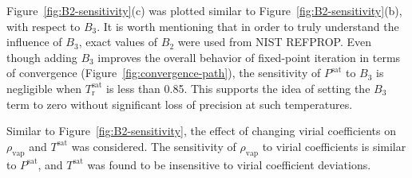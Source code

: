 \documentclass[5p,times]{elsarticle}
\begin{document}
Figure~\ref{fig:B2-sensitivity}(c) was plotted similar to Figure~\ref{fig:B2-sensitivity}(b), with respect to $B_3$. It is worth mentioning that in order to truly understand the influence of $B_3$, exact values of $B_2$ were used from NIST REFPROP. Even though adding $B_3$ improves the overall behavior of fixed-point iteration in terms of convergence (Figure~\ref{fig:convergence-path}), the sensitivity of $P^{\mathrm{sat}}$ to $B_3$ is negligible when $T_\mathrm{r}^\mathrm{sat}$ is less than 0.85. This supports the idea of setting the $B_3$ term to zero without significant loss of precision at such temperatures. 

Similar to Figure~\ref{fig:B2-sensitivity}, the effect of changing virial coefficients on $\rho_\mathrm{vap}$ and $T^\mathrm{sat}$ was considered. The sensitivity of $\rho_\mathrm{vap}$ to virial coefficients is similar to $P^\mathrm{sat}$, and $T^\mathrm{sat}$ was found to be insensitive to virial coefficient deviations.
\end{document}
